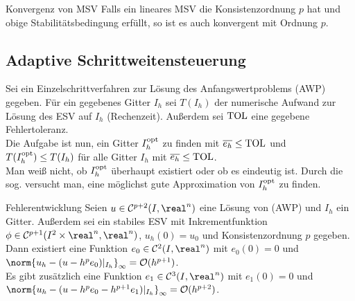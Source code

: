 \begin{Satz}{Konvergenz von MSV}
    Falls ein lineares MSV die Konsistenzordnung $p$ hat und
    obige Stabilitätsbedingung erfüllt, so ist es auch konvergent mit Ordnung
    $p$.
\end{Satz}

\pagebreak

\subsection{%
    Adaptive Schrittweitensteuerung%
}

\begin{Bem}
    Sei ein Einzelschrittverfahren zur Lösung des Anfangswertproblems (AWP)
    gegeben.
    Für ein gegebenes Gitter $I_h$ sei $T(I_h)$ der numerische Aufwand zur
    Lösung des ESV auf $I_h$ (Rechenzeit).
    Außerdem sei $\text{TOL}$ eine gegebene Fehlertoleranz.\\
    Die Aufgabe ist nun, ein Gitter $I_h^{\text{opt}}$ zu finden mit
    $\overline{e_h} \le \text{TOL}$ und
    $T(I_h^{\text{opt}}) \le T(I_h)$ für alle Gitter $I_h$ mit
    $\overline{e_h} \le \text{TOL}$.\\
    Man weiß nicht, ob $I_h^{\text{opt}}$ überhaupt existiert oder ob es eindeutig ist.
    Durch die sog.  versucht man,
    eine möglichst gute Approximation von $I_h^{\text{opt}}$ zu finden.
\end{Bem}

\begin{Satz}{Fehlerentwicklung}
    Seien $u \in \C^{p+2}(I, \real^n)$ eine Lösung von (AWP) und
    $I_h$ ein Gitter.
    Außerdem sei ein stabiles ESV mit Inkrementfunktion
    $\phi \in \C^{p+1}(I^2 \times \real^n, \real^n)$, $u_h(0) = u_0$
    und Konsistenzordnung $p$ gegeben.\\
    Dann existiert eine Funktion $e_0 \in \C^2(I, \real^n)$ mit
    $e_0(0) = 0$ und\\
    $\norm{u_h - (u - h^p e_0)|_{I_h}}_\infty = \O(h^{p+1})$.\\
    Es gibt zusätzlich eine Funktion
    $e_1 \in \C^3(I, \real^n)$ mit $e_1(0) = 0$ und\\
    $\norm{u_h - (u - h^p e_0 - h^{p+1} e_1)|_{I_h}}_\infty = \O(h^{p+2})$.
\end{Satz}

\linie

